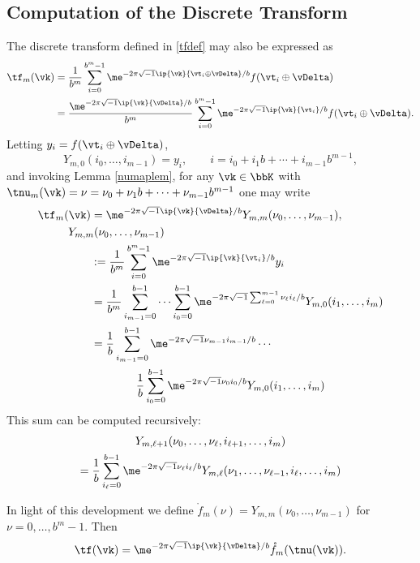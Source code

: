 \documentclass[]{elsarticle}
\theoremstyle{definition}
\begin{document}
\subsection{Computation of the Discrete Transform}
The discrete transform defined in \eqref{tfdef} may also be expressed as
\begin{align}
\nonumber
\tf_m(\vk)
&= \frac{1}{b^m} \sum_{i=0}^{b^m-1} \me^{-2 \pi \sqrt{-1} \ip{\vk}{\vt_i\oplus \vDelta}/b} f(\vt_i\oplus \vDelta) \\
\nonumber
&= \frac{\me^{-2 \pi \sqrt{-1} \ip{\vk}{\vDelta}/b}}{b^m} \sum_{i=0}^{b^m-1} \me^{-2 \pi \sqrt{-1} \ip{\vk}{\vt_i}/b} f(\vt_i\oplus \vDelta).
\end{align}
Letting $y_i=f(\vt_i\oplus \vDelta)$,
\[
Y_{m,0}(i_0,\ldots, i_{m-1}) = y_i, \qquad i=i_0 + i_1 b + \cdots + i_{m-1} b^{m-1},
\]
and invoking Lemma \ref{numaplem}, for any $\vk \in \bbK$ with $\tnu_m(\vk)=\nu = \nu_0 + \nu_1 b  + \cdots + \nu_{m-1} b^{m-1}$ one may write
\begin{align}
\nonumber
\tf_m(\vk) &= \me^{-2 \pi \sqrt{-1} \ip{\vk}{\vDelta}/b}  Y_{m,m}(\nu_0, \ldots, \nu_{m-1}) , \\
\nonumber
\MoveEqLeft{Y_{m,m}(\nu_0, \ldots, \nu_{m-1})}\\
\nonumber
& : = \frac{1}{b^m} \sum_{i=0}^{b^m-1} \me^{-2 \pi \sqrt{-1} \ip{\vk}{\vt_i}/b} y_i \\
\nonumber
& = \frac{1}{b^m} \sum_{i_{m-1}=0}^{b-1} \cdots \sum_{i_0=0}^{b-1} \me^{-2 \pi \sqrt{-1} \sum_{\ell=0}^{m-1} \nu_\ell i_\ell/b} Y_{m,0}(i_1,\ldots, i_m) \\
\nonumber
& = \frac{1}{b} \sum_{i_{m-1}=0}^{b-1}\me^{-2 \pi \sqrt{-1} \nu_{m-1} i_{m-1}/b}  \cdots \\
&\qquad \qquad \frac{1}{b} \sum_{i_0=0}^{b-1} \me^{-2 \pi \sqrt{-1} \nu_0 i_0/b} Y_{m,0}(i_1,\ldots, i_m)
\nonumber
\end{align}
This sum can be computed recursively:
\begin{multline*}
Y_{m,\ell+1}(\nu_0, \ldots, \nu_{\ell},i_{\ell+1}, \ldots, i_m) \\
= \frac{1}{b} \sum_{i_\ell=0}^{b-1} \me^{-2 \pi \sqrt{-1} \nu_\ell i_\ell/b } Y_{m,\ell}(\nu_1, \ldots, \nu_{\ell-1},i_{\ell}, \ldots, i_m)
\end{multline*}

In light of this development we define $\mathring{f}_m(\nu)=Y_{m,m}(\nu_0, \ldots, \nu_{m-1})$ for $\nu=0, \ldots, b^{m}-1$. Then
\[
\tf(\vk) = \me^{-2 \pi \sqrt{-1} \ip{\vk}{\vDelta}/b} \mathring{f}_m(\tnu(\vk)).
\]
\end{document}
